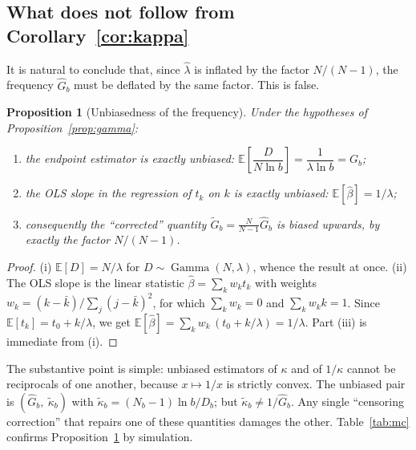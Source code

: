 \documentclass[11pt,a4paper]{article}
\theoremstyle{plain}
\newtheorem{proposition}{Proposition}
\theoremstyle{remark}
\DeclareMathOperator{\Gam}{Gamma}
\begin{document}
\subsection{What does not follow from Corollary~\ref{cor:kappa}}

It is natural to conclude that, since $\hat\lambda$ is inflated by the factor
$N/(N-1)$, the frequency $\hat G_b$ must be deflated by the same factor. This is
false.

\begin{proposition}[Unbiasedness of the frequency]\label{prop:unbiased}
Under the hypotheses of Proposition~\ref{prop:gamma}:
\begin{enumerate}
\item[\rm(i)] the endpoint estimator is exactly unbiased:
$\mathbb E\!\left[\dfrac{D}{N\ln b}\right]=\dfrac{1}{\lambda\ln b}=G_b$;
\item[\rm(ii)] the OLS slope in the regression of $t_k$ on $k$ is exactly
unbiased: $\mathbb E[\hat\beta]=1/\lambda$;
\item[\rm(iii)] consequently the ``corrected'' quantity
$\tilde G_b=\frac{N}{N-1}\hat G_b$ is biased \emph{upwards}, by exactly the
factor $N/(N-1)$.
\end{enumerate}
\end{proposition}

\begin{proof}
(i) $\mathbb E[D]=N/\lambda$ for $D\sim\Gam(N,\lambda)$, whence the result at
once. (ii) The OLS slope is the linear statistic
$\hat\beta=\sum_k w_k t_k$ with weights
$w_k=(k-\bar k)/\sum_j(j-\bar k)^2$, for which $\sum_k w_k=0$ and
$\sum_k w_k k=1$. Since $\mathbb E[t_k]=t_0+k/\lambda$, we get
$\mathbb E[\hat\beta]=\sum_k w_k\,(t_0+k/\lambda)=1/\lambda$. Part (iii) is
immediate from (i).
\end{proof}

The substantive point is simple: unbiased estimators of $\kappa$ and of
$1/\kappa$ cannot be reciprocals of one another, because $x\mapsto1/x$ is
strictly convex. The unbiased pair is $(\hat G_b,\ \tilde\kappa_b)$ with
$\tilde\kappa_b=(N_b-1)\ln b/D_b$; but $\tilde\kappa_b\ne1/\hat G_b$. Any single
``censoring correction'' that repairs one of these quantities damages the other.
Table~\ref{tab:mc} confirms Proposition~\ref{prop:unbiased} by simulation.
\end{document}
